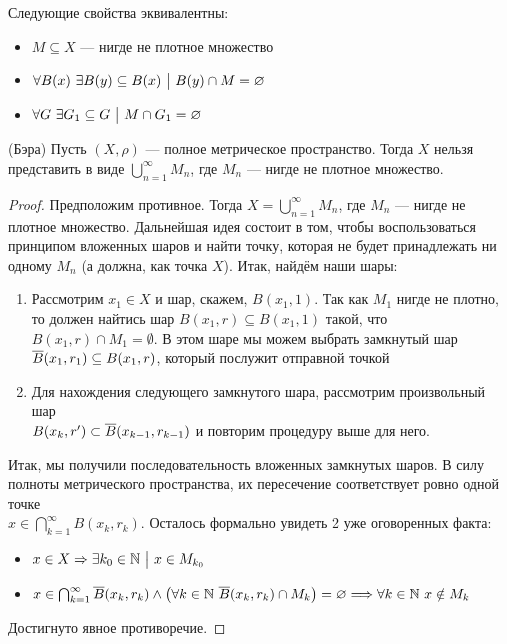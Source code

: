 \begin{proposition}
	Следующие свойства эквивалентны:
	\begin{itemize}
		\item $M \subseteq X$ --- нигде не плотное множество
		
		\item $\forall B(x)\ \exists B(y) \subseteq B(x) \ \big|\  B(y) \cap M = \varnothing$
		
		\item $\forall G\ \exists G_1 \subseteq G \ \big|\  M \cap G_1 = \varnothing$
	\end{itemize}
\end{proposition}

\begin{theorem} (Бэра)
	Пусть $(X, \rho)$ --- полное метрическое пространство. Тогда $X$ нельзя представить в виде $\bigcup_{n = 1}^\infty M_n$, где $M_n$ --- нигде не плотное множество.
\end{theorem}

\begin{proof}
	Предположим противное. Тогда $X = \bigcup_{n = 1}^\infty M_n$, где $M_n$ --- нигде не плотное множество. Дальнейшая идея состоит в том, чтобы воспользоваться принципом вложенных шаров и найти точку, которая не будет принадлежать ни одному $M_n$ (а должна, как точка $X$). Итак, найдём наши шары:
	\begin{enumerate}
		\item Рассмотрим $x_1 \in X$ и шар, скажем, $B(x_1, 1)$. Так как $M_1$ нигде не плотно, то должен найтись шар $B(x_1, r) \subseteq B(x_1, 1)$ такой, что $B(x_1, r) \cap M_1 = \emptyset$. В этом шаре мы можем выбрать замкнутый шар $\overline{B}(x_1, r_1) \subseteq B(x_1, r)$, который послужит отправной точкой
		
		\item Для нахождения следующего замкнутого шара, рассмотрим произвольный шар \\ $B(x_k, r') \subset \overline{B}(x_{k - 1}, r_{k - 1})$ и повторим процедуру выше для него.
	\end{enumerate}
	Итак, мы получили последовательность вложенных замкнутых шаров. В силу полноты метрического пространства, их пересечение соответствует ровно одной точке \\ $x \in \bigcap_{k = 1}^\infty B(x_k, r_k)$. Осталось формально увидеть 2 уже оговоренных факта:
	\begin{itemize}
		\item $x \in X \Rightarrow \exists k_0 \in \mathbb{N} \ \big|\  x \in M_{k_0}$
		
		\item $x \in \bigcap_{k = 1}^\infty \overline{B}(x_k, r_k) \wedge \big(\forall k \in \mathbb{N}\ \overline{B}(x_k, r_k) \cap M_k\big) = \varnothing \Longrightarrow \forall k \in \mathbb{N}\ x \notin M_k$
	\end{itemize}
	Достигнуто явное противоречие.
\end{proof}

